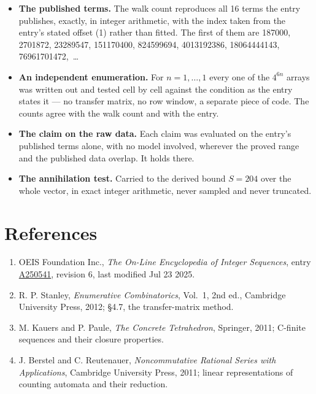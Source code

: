 \documentclass[11pt]{article}
\theoremstyle{definition}
\begin{document}
\begin{itemize}

\item {\bfseries The published terms.} The walk count reproduces all 16 terms the entry publishes, exactly, in integer arithmetic, with the index taken from the entry's stated offset (1) rather than fitted. The first of them are 187000, 2701872, 23289547, 151170400, 824599694, 4013192386, 18064444143, 76961701472,~\dots

\item {\bfseries An independent enumeration.} For $n = 1,\dots,1$ every one of the $4^{6n}$ arrays was written out and tested cell by cell against the condition as the entry states it --- no transfer matrix, no row window, a separate piece of code. The counts agree with the walk count and with the entry.

\item {\bfseries The claim on the raw data.} Each claim was evaluated on the entry's published terms alone, with no model involved, wherever the proved range and the published data overlap. It holds there.

\item {\bfseries The annihilation test.} Carried to the derived bound $S = 204$ over the whole vector, in exact integer arithmetic, never sampled and never truncated.

\end{itemize}

\section{References}

\begin{enumerate}

\item OEIS Foundation Inc., \emph{The On-Line Encyclopedia of Integer Sequences}, entry \href{https://oeis.org/A250541}{A250541}, revision 6, last modified Jul 23 2025.

\item R. P. Stanley, \emph{Enumerative Combinatorics}, Vol.~1, 2nd ed., Cambridge University Press, 2012; \S4.7, the transfer-matrix method.

\item M. Kauers and P. Paule, \emph{The Concrete Tetrahedron}, Springer, 2011; C-finite sequences and their closure properties.

\item J. Berstel and C. Reutenauer, \emph{Noncommutative Rational Series with Applications}, Cambridge University Press, 2011; linear representations of counting automata and their reduction.

\end{enumerate}
\end{document}
